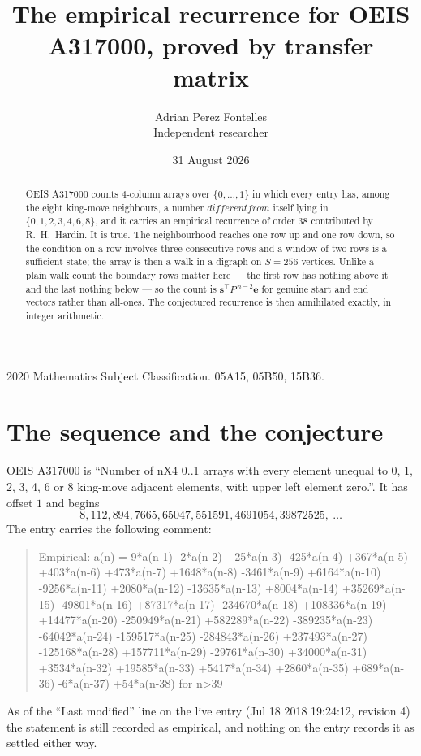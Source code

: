 \documentclass[11pt,a4paper]{article}
\title{The empirical recurrence for OEIS A317000, proved by transfer matrix}
\author{Adrian Perez Fontelles\\ \small Independent researcher}
\date{31 August 2026}
\theoremstyle{plain}
\theoremstyle{definition}
\begin{document}
\maketitle

\begin{abstract}
OEIS A317000 counts $4$-column arrays over $\{0,\dots,1\}$ in which every entry has,
among the eight king-move neighbours, a number $different from$ itself lying in $\{0,1,2,3,4,6,8\}$, and it carries an empirical
recurrence of order $38$ contributed by R.~H.~Hardin. It is true. The neighbourhood
reaches one row up and one row down, so the condition on a row involves three consecutive
rows and a window of two rows is a sufficient state; the array is then a walk in a digraph
on $S=256$ vertices. Unlike a plain walk count the boundary rows matter here --- the first
row has nothing above it and the last nothing below --- so the count is
$\mathbf{s}^{\!\top}P^{\,n-2}\mathbf{e}$ for genuine start and end vectors rather than
all-ones. The conjectured recurrence is then annihilated exactly, in integer arithmetic.
\end{abstract}

\noindent\small 2020 Mathematics Subject Classification. 05A15, 05B50, 15B36.\normalsize

\section{The sequence and the conjecture}

OEIS A317000 is ``Number of nX4 0..1 arrays with every element unequal to 0, 1, 2, 3, 4, 6 or 8 king-move adjacent elements, with upper left element zero.''. It has offset
$1$ and begins
\[
8, 112, 894, 7665, 65047, 551591, 4691054, 39872525,\ \dots
\]
The entry carries the following comment:
\begin{quote}\small
Empirical: a(n) = 9*a(n-1) -2*a(n-2) +25*a(n-3) -425*a(n-4) +367*a(n-5) +403*a(n-6) +473*a(n-7) +1648*a(n-8) -3461*a(n-9) +6164*a(n-10) -9256*a(n-11) +2080*a(n-12) -13635*a(n-13) +8004*a(n-14) +35269*a(n-15) -49801*a(n-16) +87317*a(n-17) -234670*a(n-18) +108336*a(n-19) +14477*a(n-20) -250949*a(n-21) +582289*a(n-22) -389235*a(n-23) -64042*a(n-24) -159517*a(n-25) -284843*a(n-26) +237493*a(n-27) -125168*a(n-28) +157711*a(n-29) -29761*a(n-30) +34000*a(n-31) +3534*a(n-32) +19585*a(n-33) +5417*a(n-34) +2860*a(n-35) +689*a(n-36) -6*a(n-37) +54*a(n-38) for n>39
\end{quote}
As of the ``Last modified'' line on the live entry (Jul 18 2018 19:24:12, revision
4) the statement is still recorded as empirical, and nothing on the entry
records it as settled either way.
\end{document}
